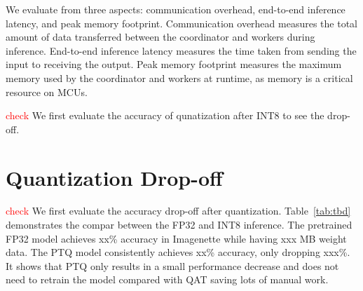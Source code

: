 We evaluate from three aspects: communication overhead, end-to-end inference latency, and peak memory footprint. Communication overhead measures the total amount of data transferred between the coordinator and workers during inference. End-to-end inference latency measures the time taken from sending the input to receiving the output. Peak memory footprint measures the maximum memory used by the coordinator and workers at runtime, as memory is a critical resource on MCUs.

\textcolor{red}{check} We first evaluate the accuracy of qunatization after INT8 to see the drop-off.

\begin{table}[t]
    \caption{Evaluated models. All weights and activations are quantized to INT8 and stored in Flash and SRAM.}
    \label{tab:eval-models}
    \centering
    \setlength{\tabcolsep}{8pt}
\end{table}


\section{Quantization Drop-off}
\textcolor{red}{check}
We first evaluate the accuracy drop-off after quantization. Table~\ref{tab:tbd} demonstrates the compar between the FP32 and INT8 inference. The pretrained FP32 model achieves xx\% accuracy in Imagenette while having xxx MB weight data. The PTQ model consistently achieves xx\% accuracy, only dropping xxx\%. It shows that PTQ only results in a small performance decrease and does not need to retrain the model compared with QAT saving lots of manual work.





